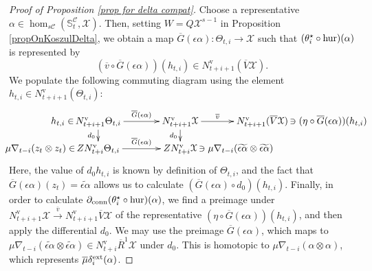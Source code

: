 \documentclass[11pt]{amsart} \renewcommand{\baselinestretch}{1.2}
\theoremstyle{plain}
\numberwithin{equation}{section} %
\theoremstyle{plain}
\numberwithin{equation}{chapter} %
\renewcommand{\to}{\longrightarrow}
\newcommand{\calx}{\mathcal{X}}
\newcommand{\calc}{\mathcal{C}}
\newcommand{\Nabla}{\nabla}
\newcommand{\uver}{^\mathrm{v}}
\newcommand{\Dendo}{R}
\begin{document}
\begin{Operations on the Bousfield-Kan spectral sequence}
\begin{proof}[Proof of Proposition \ref{prop for delta compat}]
Choose a representative $\alpha\in\hom_{s\calc}(\mathbb{S}^\calc_t, \calx )$. Then, setting $W=Q\calx^{s-1}$ in Proposition \ref{propOnKoszulDelta}, we obtain a map $\overline{G}(\epsilon\alpha):\Theta_{t,i}\to \calx $ such that $(\theta_i^\star\circ\textup{hur})(\alpha)$ is represented by
\[(\overline{v}\circ \overline{G}(\epsilon\alpha))(h_{t,i})
\in N\uver_{t+i+1}(\overline{V}\calx).\]
We populate the following commuting diagram using the element $h_{t,i}\in N\uver_{t+i+1}(\Theta_{t,i})$:
%
\[\xymatrix@R=10mm@C=30mm@!0{
\makebox[0cm][r]{$h_{t,i}\in\,$}N\uver_{t+i+1}\Theta_{t,i}\ar[d]_-{d_0}\ar[r]^-{\overline{G}(\epsilon\alpha)}&%
N\uver_{t+i+1}\calx \ar[d]_-{d_0}
\ar[r]^-{\overline{v}}
&%
N\uver_{t+i+1}(\overline{V}\calx)
\makebox[0cm][l]{$\,\ni (\eta\circ \overline{G}(\epsilon\alpha))(h_{t,i})$}
\\%
\makebox[0cm][r]{$\mu\Nabla_{t-i}( z_t\otimes  z_t)\in\,$}ZN\uver_{t+i}\Theta_{t,i}\ar[r]^-{\overline{G}(\epsilon\alpha)}
&%
ZN\uver_{t+i}\calx \makebox[0cm][l]{$\,\ni\mu\Nabla_{t-i}(\widetilde{\epsilon\alpha}\otimes \widetilde{\epsilon\alpha})$}
&%
}\]
Here, the value of $d_0h_{t,i}$ is known by definition of $\Theta_{t,i}$, 
and the fact that $\overline{G}(\epsilon\alpha)( z_t)=\widetilde{\epsilon\alpha}$ allows us to calculate $(\overline{G}(\epsilon\alpha)\circ d_0)(h_{t,i})$. Finally, in order to calculate $\partial_\textup{conn}(\theta_i^\star\circ\textup{hur})(\alpha)$, we find a preimage under $N\uver_{t+i+1}\calx \overset{\overline{v}}{\to}N\uver_{t+i+1}\overline{V}\calx$ of the representative $(\eta\circ \overline{G}(\epsilon\alpha))(h_{t,i})$, and then apply the differential $d_0$. We may use the preimage $\overline{G}(\epsilon\alpha)$, which maps to $\mu\Nabla_{t-i}(\widetilde{\epsilon\alpha}\otimes \widetilde{\epsilon\alpha})\in N\uver_{t+i}\overline{\Dendo}^1\calx $ under $d_0$. This is homotopic to $\mu\Nabla_{t-i}(\alpha\otimes \alpha)$, which represents $\overline{\mu}\delta^\textup{ext}_i(\alpha)$.
\end{proof}

\end{Operations on the Bousfield-Kan spectral sequence}
\end{document}
